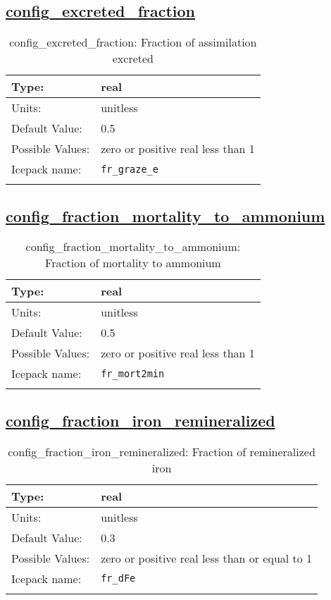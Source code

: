 \subsection[config\_excreted\_fraction]{\hyperref[sec:nm_tab_biogeochemistry]{config\_excreted\_fraction}}
\label{subsec:nm_sec_config_excreted_fraction}
\begin{center}
\begin{longtable}{| p{2.0in} || p{4.0in} |}
    \hline
    Type: & real \\
    \hline
    Units: & \si{unitless} \\
    \hline
    Default Value: & 0.5 \\
    \hline
    Possible Values: & zero or positive real less than 1 \\
    \hline
    \hline
    Icepack name: & \verb+fr_graze_e+ \\
    \caption{config\_excreted\_fraction: Fraction of assimilation excreted}
\end{longtable}
\end{center}
\subsection[config\_fraction\_mortality\_to\_ammonium]{\hyperref[sec:nm_tab_biogeochemistry]{config\_fraction\_mortality\_to\_ammonium}}
\label{subsec:nm_sec_config_fraction_mortality_to_ammonium}
\begin{center}
\begin{longtable}{| p{2.0in} || p{4.0in} |}
    \hline
    Type: & real \\
    \hline
    Units: & \si{unitless} \\
    \hline
    Default Value: & 0.5 \\
    \hline
    Possible Values: & zero or positive real less than 1 \\
    \hline
    \hline
    Icepack name: & \verb+fr_mort2min+ \\
    \caption{config\_fraction\_mortality\_to\_ammonium: Fraction of mortality to ammonium}
\end{longtable}
\end{center}
\subsection[config\_fraction\_iron\_remineralized]{\hyperref[sec:nm_tab_biogeochemistry]{config\_fraction\_iron\_remineralized}}
\label{subsec:nm_sec_config_fraction_iron_remineralized}
\begin{center}
\begin{longtable}{| p{2.0in} || p{4.0in} |}
    \hline
    Type: & real \\
    \hline
    Units: & \si{unitless} \\
    \hline
    Default Value: & 0.3 \\
    \hline
    Possible Values: & zero or positive real less than or equal to 1 \\
    \hline
    \hline
    Icepack name: & \verb+fr_dFe+ \\
    \caption{config\_fraction\_iron\_remineralized: Fraction of remineralized iron }
\end{longtable}
\end{center}
